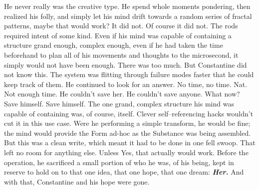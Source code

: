 \SmallVSpace
He never really was the creative type. He spend whole moments pondering, then realized his folly, and simply let his mind drift towards a random series of fractal patterns, maybe that would work?
\SomeVSpace
It did not.
\SomeVSpace
Of course it did not. The rods required intent of some kind.
\SmallVSpace
Even if his mind was capable of containing a structure grand enough, complex enough, even if he had taken the time beforehand to plan all of his movements and thoughts to the microsecond, it simply would not have been enough. There was too much. But Constantine did not know this. The system was flitting through failure modes faster that he could keep track of them. He continued to look for an answer. No time, no time.
\SomeVSpace
Nat.
\SomeVSpace
Not enough time. He couldn’t save her. He couldn’t save anyone. What now? Save himself. Save himself. The one grand, complex structure his mind was capable of containing was, of course, itself. Clever self\mbox{--}referencing hacks wouldn’t cut it in this use case. Were he performing a simple transform, he would be fine; the mind would provide the Form ad-hoc as the Substance was being assembled.
\SmallVSpace
But this was a clean write, which meant it had to be done in one fell swoop. That left no room for anything else. Unless{\el} Yes, that actually would work. Before the operation, he sacrificed a small portion of who he was, of his being, kept in reserve to hold on to that one idea, that one hope, that one dream:
\SmallVSpace
\textbf{\emph{Her.}}
\SomeVSpace
And with that, Constantine and his hope were gone.
\simpleline
{}

